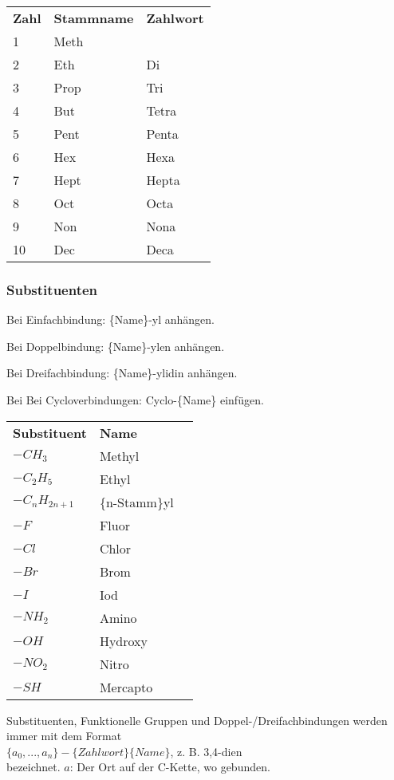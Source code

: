 \begin{center}
	\begin{tabular}{ l  l  l }
		\textbf{Zahl} & \textbf{Stammname} & \textbf{Zahlwort} \\
		1 & Meth & \\
		2 & Eth & Di\\
		3 & Prop & Tri\\
		4 & But & Tetra\\
		5 & Pent & Penta\\
		6 & Hex & Hexa\\
		7 & Hept & Hepta\\
		8 & Oct & Octa\\
		9 & Non &Nona\\
		10 & Dec &Deca\\
	\end{tabular}
\end{center}

\subsubsection{Substituenten}

Bei Einfachbindung: \{Name\}-yl anhängen.

Bei Doppelbindung:  \{Name\}-ylen anhängen.

Bei Dreifachbindung:  \{Name\}-ylidin anhängen.

Bei Bei Cycloverbindungen:  Cyclo-\{Name\} einfügen.

\begin{center}
	\begin{tabular}{ l  l  l }
		\textbf{Substituent} & \textbf{Name} \\
		$-CH_3$ & Methyl \\
		$-C_2H_5$ & Ethyl \\
		$-C_nH_{2n+1}$ & \{n-Stamm\}yl \\
		$-F$ & Fluor \\
		$-Cl$ & Chlor \\
		$-Br$ & Brom \\
		$-I$ & Iod \\
		$-NH_2$ & Amino \\
		$-OH$ & Hydroxy \\
		$-NO_2$ & Nitro \\
		$-SH$ & Mercapto \\
	\end{tabular}
\end{center}

\begin{note}
	Substituenten, Funktionelle Gruppen und Doppel-/Dreifachbindungen werden immer mit dem Format \\
	
	$\{a_0,...,a_n\}-\{Zahlwort\}\{Name\}$, z. B. 3,4-dien \\
	
	bezeichnet. 
	$a$: Der Ort auf der C-Kette, wo gebunden.
\end{note}

